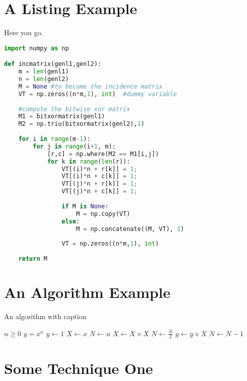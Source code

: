 \blindtext

\section{A Listing Example}

Here you go.

\begin{lstlisting}[language=Python,caption={My Listing Caption},captionpos=b]
import numpy as np

def incmatrix(genl1,genl2):
	m = len(genl1)
	n = len(genl2)
	M = None #to become the incidence matrix
	VT = np.zeros((n*m,1), int)  #dummy variable
	
	#compute the bitwise xor matrix
	M1 = bitxormatrix(genl1)
	M2 = np.triu(bitxormatrix(genl2),1) 
	
	for i in range(m-1):
		for j in range(i+1, m):
			[r,c] = np.where(M2 == M1[i,j])
			for k in range(len(r)):
				VT[(i)*n + r[k]] = 1;
				VT[(i)*n + c[k]] = 1;
				VT[(j)*n + r[k]] = 1;
				VT[(j)*n + c[k]] = 1;
	
				if M is None:
					M = np.copy(VT)
				else:
					M = np.concatenate((M, VT), 1)
				
				VT = np.zeros((n*m,1), int)
	
	return M
\end{lstlisting}

\blindtext

\section{An Algorithm Example}

\begin{algorithm}
	\caption{An algorithm with caption}\label{alg:cap}
	\begin{algorithmic}
		\Require $n \geq 0$
		\Ensure $y = x^n$
		\State $y \gets 1$
		\State $X \gets x$
		\State $N \gets n$
		\State $X \gets X \times X$
		\State $N \gets \frac{N}{2}$  
		\State $y \gets y \times X$
		\State $N \gets N - 1$
		\EndIf
		\EndWhile
	\end{algorithmic}
\end{algorithm}

\blindtext

\section{Some Technique One}
\blindtext
